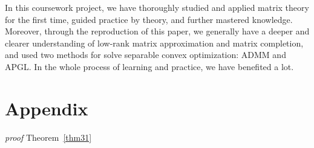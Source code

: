 \documentclass{article}
\begin{document}
{In this coursework project, we have thoroughly studied and applied matrix theory for the first time, guided practice by theory, and further mastered knowledge.
Moreover, through the reproduction of this paper, we generally have a deeper and clearer understanding of low-rank matrix approximation and matrix completion, and used two methods for solve separable convex optimization: ADMM and APGL. In the whole process of learning and practice, we have benefited a lot.


\medskip
{\small{}

}{\small\par}




\appendix


\section{Appendix}
\textit{proof} Theorem~\ref{thm31}

}
\end{document}
